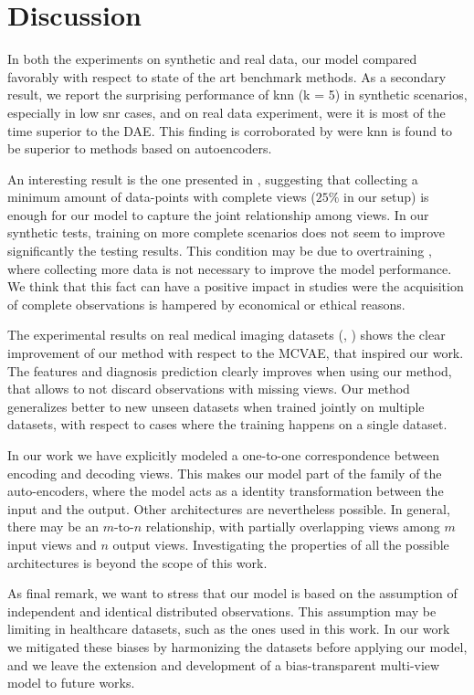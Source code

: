 \section{Discussion}

In both the experiments on synthetic and real data, our model compared favorably with respect to state of the art benchmark methods.
As a secondary result, we report the surprising performance of knn (k = 5) in synthetic scenarios, especially in low snr cases, and on real data experiment, were it is most of the time superior to the DAE.
This finding is corroborated by \cite{Platias2020} were knn is found to be superior to methods based on autoencoders.

An interesting result is the one presented in , suggesting that collecting a minimum amount of data-points with complete views ($25\%$ in our setup) is enough for our model to capture the joint relationship among views.
In our synthetic tests, training on more complete scenarios does not seem to improve significantly the testing results.
This condition may be due to overtraining \citep{Bilbao2017}, where collecting more data is not necessary to improve the model performance.
We think that this fact can have a positive impact in studies were the acquisition of complete observations is hampered by economical or ethical reasons.

The experimental results on real medical imaging datasets (, ) shows the clear improvement of our method with respect to the MCVAE, that inspired our work.
The features and diagnosis prediction clearly improves when using our method, that allows to not discard observations with missing views.
Our method generalizes better to new unseen datasets when trained jointly on multiple datasets, with respect to cases where the training happens on a single dataset.

In our work we have explicitly modeled a one-to-one correspondence between encoding and decoding views.
This makes our model part of the family of the auto-encoders, where the model acts as a identity transformation between the input and the output.
Other architectures are nevertheless possible.
In general, there may be an $m$-to-$n$ relationship, with partially overlapping views among $m$ input views and $n$ output views.
Investigating the properties of all the possible architectures is beyond the scope of this work.

As final remark, we want to stress that our model is based on the assumption of independent and identical distributed observations.
This assumption may be limiting in healthcare datasets, such as the ones used in this work.
In our work we mitigated these biases by harmonizing the datasets before applying our model, and we leave the extension and development of a bias-transparent multi-view model to future works.

